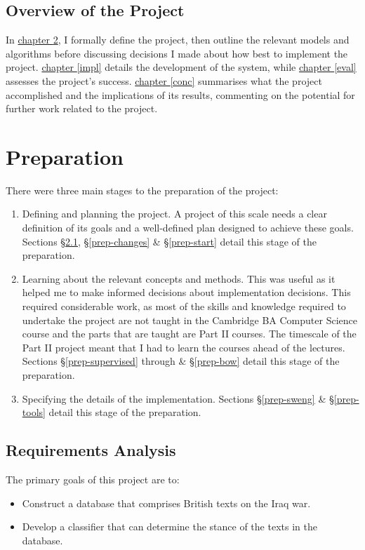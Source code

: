 \documentclass[12pt,a4paper,twoside,openright]{report}
\begin{document}
\section{Overview of the Project}
In \hyperref[prep]{chapter \ref{prep}}, I formally define the project, then outline the relevant models and algorithms before discussing decisions I made about how best to implement the project. \hyperref[impl]{chapter \ref{impl}} details the development of the system, while \hyperref[eval]{chapter \ref{eval}} assesses the project's success. \hyperref[conc]{chapter \ref{conc}} summarises what the project accomplished and the implications of its results, commenting on the potential for further work related to the project.

\chapter{Preparation} \label{prep}


There were three main stages to the preparation of the project:
\begin{enumerate}
	\item Defining and planning the project. A project of this scale needs a clear definition of its goals and a well-defined plan designed to achieve these goals. Sections \S\ref{prep-requirements}, \S\ref{prep-changes} \& \S\ref{prep-start} detail this stage of the preparation.

	\item Learning about the relevant concepts and methods. This was useful as it helped me to make informed decisions about implementation decisions. This required considerable work, as most of the skills and knowledge required to undertake the project are not taught in the Cambridge BA Computer Science course and the parts that are taught are Part II courses. The timescale of the Part II project meant that I had to learn the courses ahead of the lectures. Sections \S\ref{prep-supervised} through \& \S\ref{prep-bow} detail this stage of the preparation.
	
	\item Specifying the details of the implementation. Sections \S\ref{prep-sweng} \& \S\ref{prep-tools} detail this stage of the preparation.
\end{enumerate}

\section{Requirements Analysis} \label{prep-requirements}
The primary goals of this project are to:
\begin{itemize}
	\item Construct a database that comprises British texts on the Iraq war.
	\item Develop a classifier that can determine the stance of the texts in the database.
\end{itemize}
\end{document}
